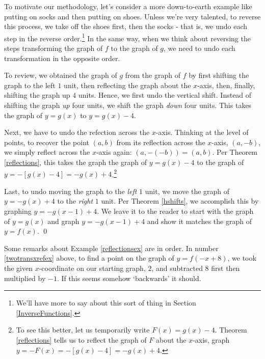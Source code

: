 \begin{ex}
\begin{enumerate}
 \smallskip
 
 To motivate our methodology, let's consider a more down-to-earth example like putting on socks and then putting on shoes.  Unless we're very talented,  to reverse this process, we take off the shoes first, then the socks - that is, we undo each step in the reverse order.\footnote{We'll have more to say about this sort of thing in Section \ref{InverseFunctions}.}  In the same way, when we think about reversing the steps transforming the graph of $f$ to the graph of $g$, we need to undo each transformation in the opposite order.  
 
 \smallskip
 
 To review, we obtained the graph of $g$ from the graph of $f$ by first shifting the graph to the left $1$ unit, then reflecting the graph about the $x$-axis, then, finally, shifting the graph up $4$ units.  Hence, we first undo the vertical shift.  Instead of shifting the graph \textit{up} four units, we shift the graph \textit{down} four units.  This takes the graph of $y = g(x)$ to $y = g(x)-4$.  
 
 \smallskip
 
 Next, we have to undo the refection across the $x$-axis.  Thinking at the level of points, to recover the point $(a,b)$ from its reflection across the $x$-axis, $(a,-b)$, we simply reflect across the $x$-axis again: $(a,-(-b)) = (a,b)$.  Per Theorem \ref{reflections}, this takes the graph the graph of $y = g(x)-4$ to the graph of $y = -[g(x)-4] = -g(x) + 4$.\footnote{To see this better, let us temporarily write $F(x) = g(x)-4$.  Theorem \ref{reflections} tells us to reflect the graph of $F$ about the $x$-axis, graph $y=-F(x) = - [g(x)-4] = -g(x)+4$.} 
 
 \smallskip
 
 Last, to undo moving the graph to the \textit{left} $1$ unit, we move the graph of $y=-g(x)+4$ to the \textit{right} $1$ unit.  Per Theorem \ref{hshifts}, we accomplish this by graphing $y = -g(x-1)+4$.  We leave it to the reader to start with the graph of $y=g(x)$ and graph $y = -g(x-1)+4$ and show it matches the graph of $y=f(x)$. \qed
    
 \end{enumerate}

\end{ex}

Some remarks about Example \ref{reflectionsex}  are in order. In number \ref{twotransxrefex} above, to find a point on the graph of $y=f(-x+8)$, we took the given $x$-coordinate on our starting graph, $2$, and subtracted $8$ first then multiplied by $-1$.  If this seems somehow `backwards' it should.  

